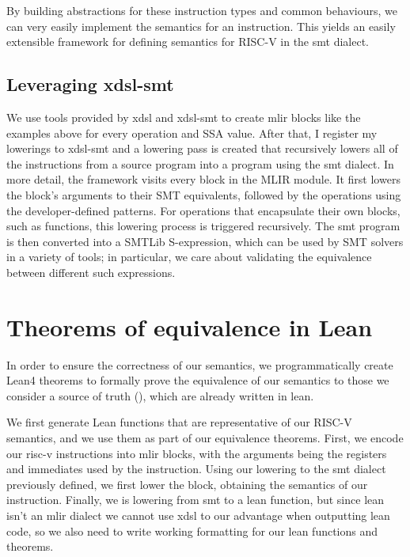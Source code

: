By building abstractions for these instruction types and common behaviours, we can very easily
implement the semantics for an instruction. This yields an easily extensible framework for 
defining semantics for RISC-V in the smt dialect.
\subsection{Leveraging xdsl-smt}

We use tools provided by xdsl and xdsl-smt to create mlir blocks like the examples above for every 
operation and SSA value. After that, I register my lowerings to xdsl-smt and a lowering pass is created 
that recursively lowers all of the instructions from a source program into a program using the smt dialect.
%
In more detail, the framework visits every block in the MLIR module. It first lowers the block's 
arguments to their SMT equivalents, followed by the operations using the developer-defined 
patterns. For operations that encapsulate their own blocks, such as functions, this lowering 
process is triggered recursively.
%
The smt program is then converted into a SMTLib S-expression, which can be used by SMT solvers
in a variety of tools; in particular, we care about validating the equivalence between different
such expressions.

\section{Theorems of equivalence in Lean}

\label{lean theorems}

In order to ensure the correctness of our semantics, we programmatically create Lean4 theorems
to formally prove the equivalence of our semantics to those we consider a source of truth (\cite{riscv-lean}),
which are already written in lean.

We first generate Lean functions that are representative of our RISC-V semantics, and we use them
as part of our equivalence theorems. First, we encode our risc-v instructions into mlir blocks, 
with the arguments being the registers and immediates used by the instruction. Using our lowering to the smt dialect previously defined,
we first lower the block, obtaining the semantics of our instruction. 
%
Finally, we is lowering from smt to a lean function, but since lean isn't an mlir
dialect we cannot use xdsl to our advantage when outputting lean code, so we also need to write 
working formatting for our lean functions and theorems.

